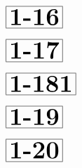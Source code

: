 \documentclass[a4paper, 10pt]{article}
\begin{document}
\begin{minipage}[t]{0.15\textwidth}
                \vspace*{-1.59cm}
        \hspace*{0.75cm}
        $\boxed{\textbf{\Huge1-16}}$
\end{minipage}
\begin{minipage}[t]{0.85\textwidth}
    
\end{minipage}

\begin{minipage}[t]{0.15\textwidth}
                \vspace*{-1.59cm}
        \hspace*{0.75cm}
        $\boxed{\textbf{\Huge1-17}}$
\end{minipage}
\begin{minipage}[t]{0.85\textwidth}
    
\end{minipage}

\thispagestyle{empty}
\begin{minipage}[t]{0.15\textwidth}
                \vspace*{-1.59cm}
        \hspace*{0.25cm}
        $\boxed{\textbf{\Huge1-181}}$
\end{minipage}
\begin{minipage}[t]{0.85\textwidth}
    
\end{minipage}

\begin{minipage}[t]{0.15\textwidth}
                \vspace*{-1.59cm}
        \hspace*{0.75cm}
        $\boxed{\textbf{\Huge1-19}}$
\end{minipage}
\begin{minipage}[t]{0.85\textwidth}
    
\end{minipage}

\begin{minipage}[t]{0.15\textwidth}
                \vspace*{-1.59cm}
        \hspace*{0.75cm}
        $\boxed{\textbf{\Huge1-20}}$
\end{minipage}
\begin{minipage}[t]{0.85\textwidth}
    
\end{minipage}
\end{document}
